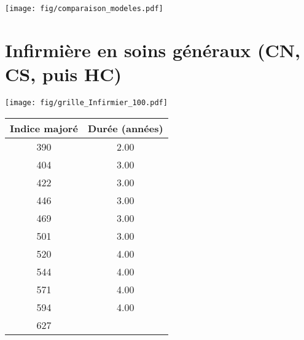 
 \begin{center}\texttt{[image: fig/comparaison\_modeles.pdf]}\end{center} 

\newpage 
 
\chapter{Infirmière en soins généraux (CN, CS, puis HC)} 

\begin{minipage}{0.55\linewidth}\texttt{[image: fig/grille\_Infirmier\_100.pdf]}\end{minipage} 
\begin{minipage}{0.3\linewidth} 
 \begin{center} 

\begin{tabular}[htb]{|c|c|} 
\hline 
 Indice majoré &  Durée (années) \\ 
\hline \hline 
 390 &  2.00 \\ 
\hline 
 404 &  3.00 \\ 
\hline 
 422 &  3.00 \\ 
\hline 
 446 &  3.00 \\ 
\hline 
 469 &  3.00 \\ 
\hline 
 501 &  3.00 \\ 
\hline 
 520 &  4.00 \\ 
\hline 
 544 &  4.00 \\ 
\hline 
 571 &  4.00 \\ 
\hline 
 594 &  4.00 \\ 
\hline 
 627 &   \\ 
\hline 
\hline 
\end{tabular} 
\end{center} 
 \end{minipage} 

~\\ 
 


   
 \localtableofcontents 

~\\ 
 
